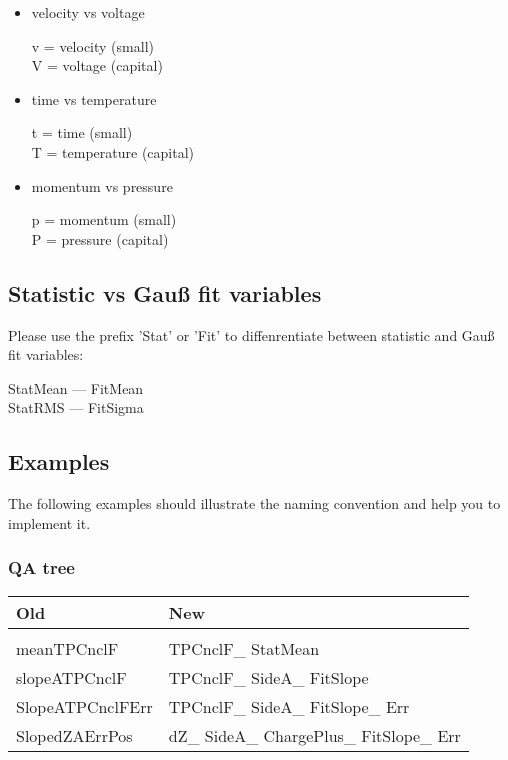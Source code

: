 \documentclass[11pt,a4paper]{article}
\begin{document}
\begin{itemize}
 
\item velocity vs voltage 

v = velocity (small) \\
V = voltage  (capital)

\item time vs temperature

t = time        (small)\\
T = temperature (capital)

\item momentum vs pressure

p = momentum (small) \\
P = pressure (capital)

\end{itemize}


\subsection{Statistic vs Gau\ss{} fit variables}

Please use the prefix 'Stat' or 'Fit' to diffenrentiate between statistic and Gau\ss{} fit variables: \\ \setlength{\parskip}{1pt}
   
StatMean --- FitMean \\
\hspace*{0.5cm} StatRMS  --- FitSigma

\subsection{Examples}

The following examples should illustrate the naming convention and help you to implement it.

\subsubsection{QA tree}
\begin{tabular}{l l}
Old & New \\ 
\hline 
 &  \\
meanTPCnclF & TPCnclF\_ StatMean \\ 
slopeATPCnclF &  TPCnclF\_ SideA\_ FitSlope\\ 
SlopeATPCnclFErr &  TPCnclF\_ SideA\_ FitSlope\_ Err\\ 
SlopedZAErrPos &  dZ\_ SideA\_ ChargePlus\_ FitSlope\_ Err\\ 
\end{tabular} 
\end{document}
